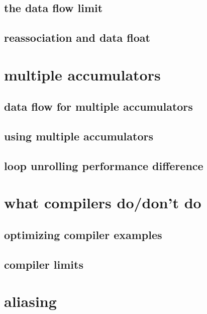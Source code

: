 \subsection{the data flow limit}


\subsection{reassociation and data float}


\section{multiple accumulators}

\subsection{data flow for multiple accumulators}


\subsection{using multiple accumulators}


\subsection{loop unrolling performance difference} %


\section{what compilers do/don't do}

\subsection{optimizing compiler examples}  %


\subsection{compiler limits}


\section{aliasing}

